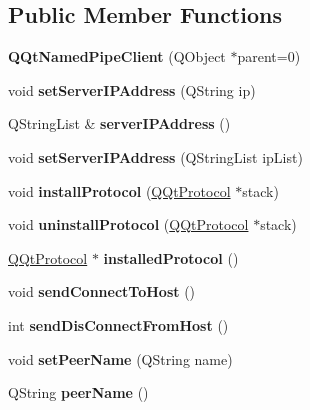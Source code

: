 \subsection*{Public Member Functions}
\begin{DoxyCompactItemize}
\item 
\mbox{\label{class_q_qt_named_pipe_client_abedd9c01437c5ca4e2973260bce0411b}} 
{\bfseries Q\+Qt\+Named\+Pipe\+Client} (Q\+Object $\ast$parent=0)
\item 
\mbox{\label{class_q_qt_named_pipe_client_ac9ca1b3c6efdcb84965191d75c412684}} 
void {\bfseries set\+Server\+I\+P\+Address} (Q\+String ip)
\item 
\mbox{\label{class_q_qt_named_pipe_client_a1eb2955d1f5d97ba068622351201756c}} 
Q\+String\+List \& {\bfseries server\+I\+P\+Address} ()
\item 
\mbox{\label{class_q_qt_named_pipe_client_a5fc853fe803baf091b8adf0e08f28506}} 
void {\bfseries set\+Server\+I\+P\+Address} (Q\+String\+List ip\+List)
\item 
\mbox{\label{class_q_qt_named_pipe_client_ab7fcd7e037795af63d3dea99a67ea9ed}} 
void {\bfseries install\+Protocol} (\mbox{\hyperlink{class_q_qt_protocol}{Q\+Qt\+Protocol}} $\ast$stack)
\item 
\mbox{\label{class_q_qt_named_pipe_client_a12359131685a780f2b5d505d08ae5b80}} 
void {\bfseries uninstall\+Protocol} (\mbox{\hyperlink{class_q_qt_protocol}{Q\+Qt\+Protocol}} $\ast$stack)
\item 
\mbox{\label{class_q_qt_named_pipe_client_ae82259a41f86af3725e13dd1eff73851}} 
\mbox{\hyperlink{class_q_qt_protocol}{Q\+Qt\+Protocol}} $\ast$ {\bfseries installed\+Protocol} ()
\item 
\mbox{\label{class_q_qt_named_pipe_client_a7c0f95a9df54e3a6ddf96bd1db042003}} 
void {\bfseries send\+Connect\+To\+Host} ()
\item 
\mbox{\label{class_q_qt_named_pipe_client_ac2ab3fd08e6cc7f75070ced80f800c3c}} 
int {\bfseries send\+Dis\+Connect\+From\+Host} ()
\item 
\mbox{\label{class_q_qt_named_pipe_client_abff74f5178be2fdf799d6707ee5510b2}} 
void {\bfseries set\+Peer\+Name} (Q\+String name)
\item 
\mbox{\label{class_q_qt_named_pipe_client_a27aadce8c91dcd7264a7e4a64dcd223b}} 
Q\+String {\bfseries peer\+Name} ()
\end{DoxyCompactItemize}
